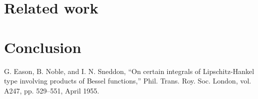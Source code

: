 \documentclass[conference]{IEEEtran}
\begin{document}
\section{Related work}


\section{Conclusion}



\begin{thebibliography}{00}
 G. Eason, B. Noble, and I. N. Sneddon, ``On certain integrals of Lipschitz-Hankel type involving products of Bessel functions,'' Phil. Trans. Roy. Soc. London, vol. A247, pp. 529--551, April 1955.

\end{thebibliography}
\end{document}
